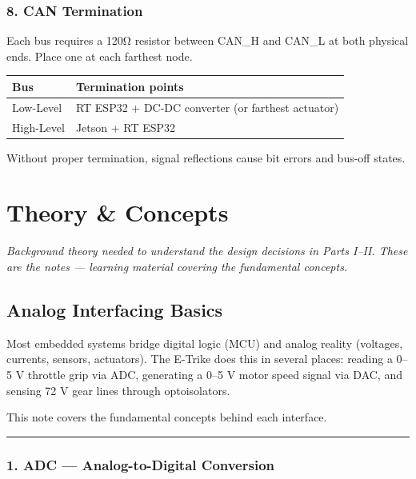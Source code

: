 \documentclass[12pt,a4paper,oneside]{report}
\begin{document}
\section{8. CAN Termination}\label{can-termination}

Each bus requires a 120Ω resistor between CAN\_H and CAN\_L at both physical
ends. Place one at each farthest node.

\begin{longtable}[]{@{}ll@{}}
\toprule\noalign{}
Bus & Termination points \\
\midrule\noalign{}
\endhead
\bottomrule\noalign{}
\endlastfoot
Low-Level & RT ESP32 + DC-DC converter (or farthest actuator) \\
High-Level & Jetson + RT ESP32 \\
\end{longtable}

Without proper termination, signal reflections cause bit errors and bus-off
states.



\part{Theory \& Concepts}
\label{part:notes}

\textit{Background theory needed to understand the design decisions in Parts I--II. These are the notes --- learning material covering the fundamental concepts.}

\chapter{Analog Interfacing Basics}\label{analog-interfacing-basics}

Most embedded systems bridge digital logic (MCU) and analog reality (voltages,
currents, sensors, actuators). The E-Trike does this in several places: reading
a 0--5 V throttle grip via ADC, generating a 0--5 V motor speed signal via DAC,
and sensing 72 V gear lines through optoisolators.

This note covers the fundamental concepts behind each interface.

\begin{center}\rule{0.5\linewidth}{0.5pt}\end{center}

\section{1. ADC --- Analog-to-Digital
Conversion}\label{adc-analog-to-digital-conversion}
\end{document}
